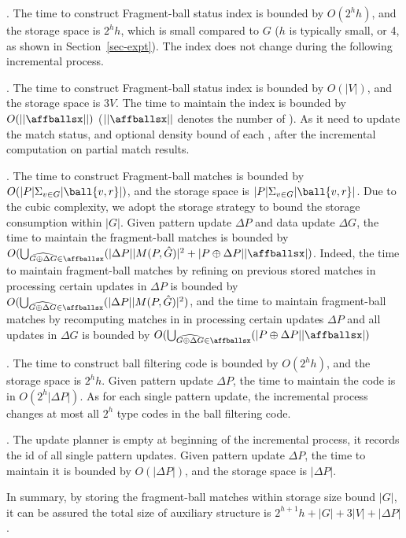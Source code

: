 . The time to construct Fragment-ball status index is bounded by $O(2^hh)$, and the storage space is $2^hh$, which is small compared to $G$ ($h$ is typically small,  or 4, as shown in Section~\ref{sec-expt}). The index does not change during the following incremental process.

. The time to construct Fragment-ball status index is bounded by $O(|V|)$, and the storage space is $3V$. The time to maintain the index is bounded by $O(||\affballsx||)$ ($||\affballsx||$ denotes the number of \affballsx). As it need to update the match status, \cflag and optional density bound \dens of each \affballx, after the incremental computation on partial match results.

. The time to construct Fragment-ball matches is bounded by $O(|P|\Sigma_{v\in G}|\ball{v, r}|)$, and the storage space is $|P|\Sigma_{v\in G}|\ball{v, r}|$. Due to the cubic complexity, we adopt the storage strategy to bound the storage consumption within $|G|$. Given pattern update $\Delta P$ and data update $\Delta G$, the time to maintain the fragment-ball matches is bounded by $O(\bigcup_{\widehat{G\oplus\Delta G}\in \affballsx}(|\Delta P||M(P, \hat{G})|^2 + |P \oplus \Delta P||\affballsx|)$. Indeed, the time to maintain fragment-ball matches by refining on previous stored matches in processing certain updates in $\Delta P$ is bounded by $O(\bigcup_{\widehat{G\oplus\Delta G}\in \affballsx}(|\Delta P||M(P, \hat{G})|^2)$, and the time to maintain fragment-ball matches by recomputing matches in in processing certain updates $\Delta P$ and all updates in $\Delta G$ is bounded by $O(\bigcup_{\widehat{G\oplus\Delta G}\in \affballsx}(|P \oplus \Delta P||\affballsx|)$


. The time to construct ball filtering code is bounded by $O(2^hh)$, and the storage space is $2^hh$. Given pattern update $\Delta P$, the time to maintain the code is in $O(2^h|\Delta P|)$. As for each single pattern update, the incremental process changes at most all $2^h$ type codes in the ball filtering code.

. The update planner is empty at beginning of the incremental process, it records the id of all single pattern updates. Given pattern update $\Delta P$, the time to maintain it is bounded by $O(|\Delta P|)$, and the storage space is $|\Delta P|$.

In summary, by storing the fragment-ball matches within storage size bound $|G|$, it can be assured the total size of auxiliary structure is $2^{h+1}h+|G|+3|V|+|\Delta P|$.

